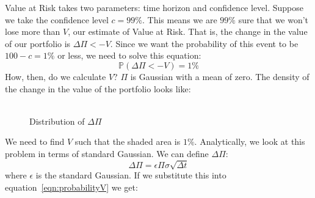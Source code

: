 \documentclass[../analytical_approach.tex]{subfiles}
\begin{document}
Value at Risk takes two parameters: time horizon and confidence level. Suppose we take the confidence level $c=99\%$.
This means we are $99\%$ sure that we won't lose more than $V$, our estimate of Value at Risk.
That is, the change in the value of our portfolio is $\Delta\Pi<-V$.
Since we want the probability of this event to be $100-c=1\%$ or less, we need to solve this equation:
\begin{equation}
    \label{eqn:probabilityV}
    \mathbb{P}(\Delta\Pi<-V) = 1\%
\end{equation}
How, then, do we calculate $V$?
$\Pi$ is Gaussian with a mean of zero.
The density of the change in the value of the portfolio looks like:\\\\
\begin{figure}
    \centering
    \caption{Distribution of $\Delta\Pi$}
    \label{fig:deltapi}
\end{figure}
We need to find $V$ such that the shaded area is $1\%$.
Analytically, we look at this problem in terms of standard Gaussian.
We can define $\Delta\Pi$:
\begin{equation}
    \label{eqn:deltapi}
    \Delta\Pi = \epsilon\Pi\sigma\sqrt{\Delta t}
\end{equation}
where $\epsilon$ is the standard Gaussian.
If we substitute this into equation~\ref{eqn:probabilityV} we get:
\end{document}
